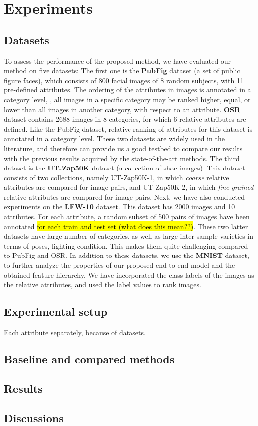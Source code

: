 

\section{Experiments}

\subsection{Datasets}
To assess the performance of the proposed method, we have evaluated our method on five datasets:
The first one is the \textbf{PubFig} \cite{pubfig} dataset (a set of public figure faces), which consists of 800 facial images of 8 random subjects, with 11 pre-defined attributes. The ordering of the attributes in images is annotated in a category level, \ie, all images in a specific category may be ranked higher, equal, or lower than all images in another category, with respect to an attribute.
\textbf{OSR} \cite{oliva2001modeling} dataset contains 2688 images in 8 categories, for which 6 relative attributes are defined. Like the PubFig dataset, relative ranking of attributes for this dataset is annotated in a category level. These two datasets are widely used in the literature, and therefore can provide us a good testbed to compare our results with the previous results acquired by the state-of-the-art methods. 
The third dataset is the  \textbf{UT-Zap50K} \cite{Yu2014} dataset (a collection of shoe images). This dataset consists of two collections, namely UT-Zap50K-1, in which \textit{coarse} relative attributes are compared for image pairs, and UT-Zap50K-2, in which \textit{fine-grained} relative attributes are compared for image pairs.  
Next, we have also conducted experiments on the \textbf{LFW-10} \cite{Sandeep_2014_CVPR} dataset. This dataset has 2000 images and 10 attributes. For each attribute, a random subset of 500 pairs of images have been annotated \hl{for each train and test set (what does this mean??)}. These two latter datasets have large number of categories, as well as large inter-sample varieties in terms of poses, lighting condition. This makes them quite challenging compared to PubFig and OSR.
In addition to these datasets, we use the \textbf{MNIST} \cite{lecun1998mnist} dataset, to further analyze the properties of our proposed end-to-end model and the obtained feature hierarchy. We have incorporated the class labels of the images as the relative attributes, and used the label values to rank images.
\subsection{Experimental setup}

Each attribute separately, because of datasets.
\subsection{Baseline and compared methods}
\subsection{Results}
\subsection{Discussions}

